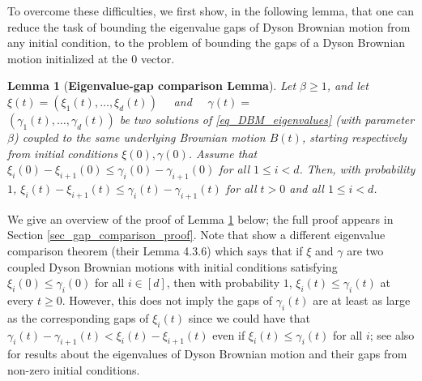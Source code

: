 \documentclass[11pt,letterpaper]{article}
\newtheorem{lemma}[theorem]{Lemma}
\begin{document}
To overcome these difficulties, we first show, in the following lemma, that one can reduce the task of bounding the eigenvalue gaps of Dyson Brownian motion from any initial condition, to the problem of bounding the gaps of a Dyson Brownian motion initialized at the $0$ vector.
%
\begin{lemma}[\bf Eigenvalue-gap comparison Lemma]\label{lemma_gap_comparison}
\quad Let $\beta \geq 1$, and let $\xi(t) = (\xi_1(t), \ldots, \xi_d(t))$ \, \, and \, \, $\gamma(t) =$ \\ $(\gamma_1(t), \ldots, \gamma_d(t))$ be two solutions of \eqref{eq_DBM_eigenvalues} (with parameter $\beta$) coupled to the same underlying Brownian motion $B(t)$, starting respectively from initial conditions $\xi(0), \gamma(0)$. 
%
Assume that $\xi_i(0) - \xi_{i+1}(0)  \leq \gamma_i(0) - \gamma_{i+1}(0)$ for all $1\leq i < d$.
%
Then, with probability $1$, $\xi_i(t) - \xi_{i+1}(t)  \leq \gamma_i(t) - \gamma_{i+1}(t)$ for all  $t>0$ and all $1\leq i < d$.
\end{lemma}
%
\noindent
 We give an overview of the proof of Lemma \ref{lemma_gap_comparison} below; the full proof appears in Section \ref{sec_gap_comparison_proof}.
Note that \cite{anderson2010introduction} show a different eigenvalue comparison theorem (their Lemma 4.3.6) which says that if $\xi$ and $\gamma$ are two coupled Dyson Brownian motions with initial conditions satisfying $\xi_i(0) \leq \gamma_i(0)$ for all $i \in [d]$, then with probability $1$,  $\xi_i(t) \leq \gamma_i(t)$ at every $t \geq 0$.  However, this does not imply the gaps of $\gamma_i(t)$ are at least as large as the corresponding gaps of $\xi_i(t)$ since we could have that $\gamma_i(t) - \gamma_{i+1}(t) < \xi_i(t)- \xi_{i+1}(t)$ even if $\xi_i(t) \leq \gamma_i(t)$ for all $i$; see also \cite{erdHos2011universality, landon2017convergence,lee2016bulk} for results about the eigenvalues of Dyson Brownian motion and their gaps from non-zero initial conditions.
\end{document}
